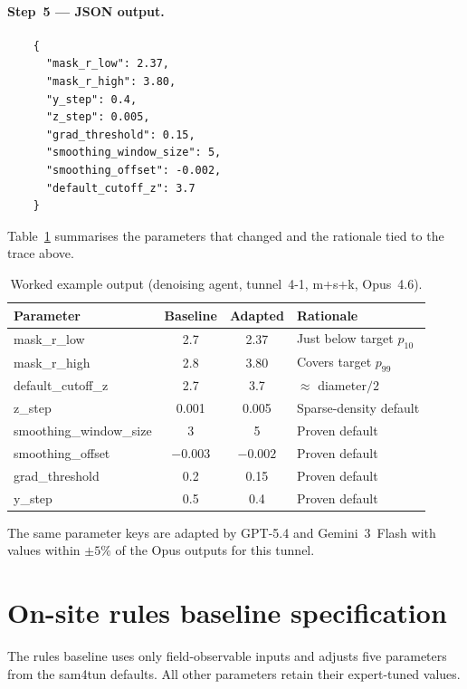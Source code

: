 \paragraph{Step~5 --- JSON output.}
\begin{verbatim}
    {
      "mask_r_low": 2.37,
      "mask_r_high": 3.80,
      "y_step": 0.4,
      "z_step": 0.005,
      "grad_threshold": 0.15,
      "smoothing_window_size": 5,
      "smoothing_offset": -0.002,
      "default_cutoff_z": 3.7
    }
\end{verbatim}

Table~\ref{tab:cot-example} summarises the parameters that changed and the rationale tied to the trace above.

\begin{table}[ht]
\caption{Worked example output (denoising agent, tunnel~4-1, m+s+k, Opus~4.6).}\label{tab:cot-example}
\begin{tabular*}{\tblwidth}{@{} l c c l @{}}
\toprule
Parameter & Baseline & Adapted & Rationale \\
\midrule
mask\_r\_low & 2.7 & 2.37 & Just below target $p_{10}$ \\
mask\_r\_high & 2.8 & 3.80 & Covers target $p_{99}$ \\
default\_cutoff\_z & 2.7 & 3.7 & $\approx$ diameter$/2$ \\
z\_step & 0.001 & 0.005 & Sparse-density default \\
smoothing\_window\_size & 3 & 5 & Proven default \\
smoothing\_offset & $-0.003$ & $-0.002$ & Proven default \\
grad\_threshold & 0.2 & 0.15 & Proven default \\
y\_step & 0.5 & 0.4 & Proven default \\
\bottomrule
\end{tabular*}
\end{table}

The same parameter keys are adapted by GPT-5.4 and Gemini~3~Flash with values within $\pm 5\%$ of the Opus outputs for this tunnel.

\section{On-site rules baseline specification}\label{app:rules}

The rules baseline uses only field-observable inputs and adjusts five parameters from the sam4tun defaults. All other parameters retain their expert-tuned values.

